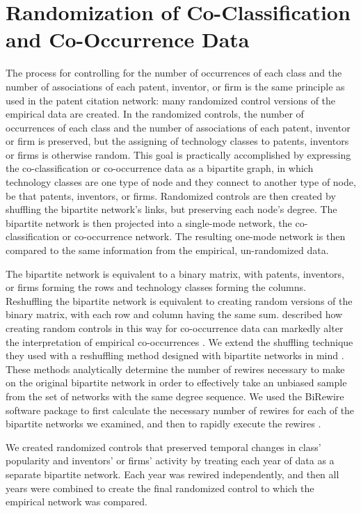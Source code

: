 \documentclass[]{svjour3}
\begin{document}
\section{Randomization of Co-Classification and Co-Occurrence Data}\label{Cooccurrence_Methods}
 The process for controlling for the number of occurrences of each class and the number of associations of each patent, inventor, or firm is the same principle as used in the patent citation network: many randomized control versions of the empirical data are created.  In the randomized controls, the number of occurrences of each class and the number of associations of each patent, inventor or firm is preserved, but the assigning of technology classes to patents, inventors or firms is otherwise random. This goal is practically accomplished by expressing the co-classification or co-occurrence data as a bipartite graph, in which technology classes are one type of node and they connect to another type of node, be that patents, inventors, or firms. Randomized controls are then created by shuffling the bipartite network's links, but preserving each node's degree. The bipartite network is then projected into a single-mode network, the co-classification or co-occurrence network. The resulting one-mode network is then compared to the same information from the empirical, un-randomized data.

The bipartite network is  equivalent to a binary matrix, with patents, inventors, or firms forming the rows and technology classes forming the columns. Reshuffling the bipartite network is equivalent to creating random versions of the binary matrix, with each row and column having the same sum. \citet{Bottazzi2010} described how creating random controls in this way for co-occurrence data can markedly alter the interpretation of empirical co-occurrences . We extend the shuffling technique they used with a reshuffling method designed with bipartite networks in mind \citep{Gobbi2014}. These methods analytically determine the number of rewires necessary to make on the original bipartite network in order to effectively take an unbiased sample from the set of networks with the same degree sequence. We used the BiRewire software package to first calculate the necessary number of rewires for each of the bipartite networks we examined, and then to rapidly execute the rewires \citep{Gobbi2015}.

We created randomized controls that preserved temporal changes in class' popularity and inventors' or firms' activity by treating each year of data as a separate bipartite network. Each year was rewired independently, and then all years were combined to create the final randomized control to which the empirical network was compared.
\end{document}
